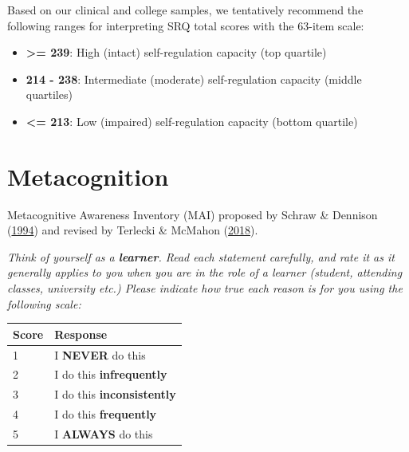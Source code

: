 \documentclass[letterpaper, nobind]{templates/ociamthesis}
\providecommand{\tightlist}{%
  \setlength{\itemsep}{0pt}\setlength{\parskip}{0pt}}
\begin{document}
Based on our clinical and college samples, we tentatively recommend the following ranges for interpreting SRQ total scores with the 63-item scale:

\begin{itemize}
\tightlist
\item
  \textbf{\textgreater= 239}: High (intact) self-regulation capacity (top quartile)
\item
  \textbf{214 - 238}: Intermediate (moderate) self-regulation capacity (middle quartiles)
\item
  \textbf{\textless= 213}: Low (impaired) self-regulation capacity (bottom quartile)
\end{itemize}

\hypertarget{app-mai}{%
\section{Metacognition}\label{app-mai}}

Metacognitive Awareness Inventory (MAI) proposed by
Schraw \& Dennison (\protect\hyperlink{ref-schraw1994assessing}{1994}) and revised by Terlecki \& McMahon (\protect\hyperlink{ref-terlecki2018call}{2018}).

\emph{Think of yourself as a \textbf{learner}. Read each statement carefully, and
rate it as it generally applies to you when you are in the role of a
learner (student, attending classes, university etc.) Please indicate
how true each reason is for you using the following scale:}

\begin{longtable}[]{@{}ll@{}}
\toprule()
Score & Response \\
\midrule()
\endhead
1 & I \textbf{NEVER} do this \\
2 & I do this \textbf{infrequently} \\
3 & I do this \textbf{inconsistently} \\
4 & I do this \textbf{frequently} \\
5 & I \textbf{ALWAYS} do this \\
\bottomrule()
\end{longtable}
\end{document}
